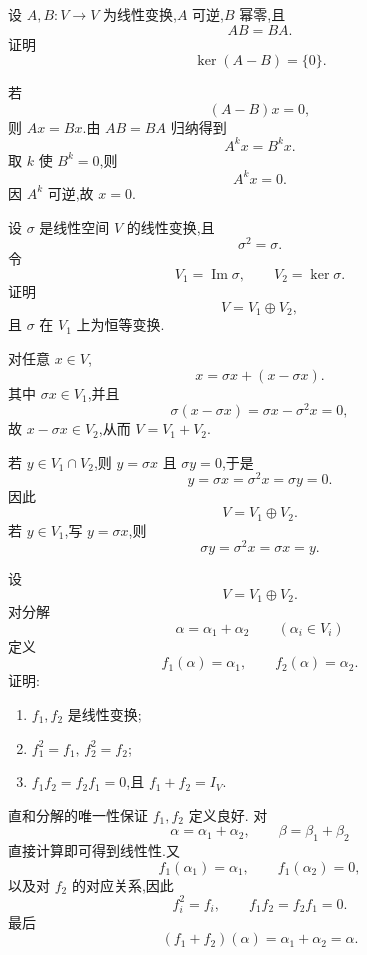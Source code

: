 \begin{example}
设 $A,B:V\to V$ 为线性变换,$A$ 可逆,$B$ 幂零,且
\[
AB=BA.
\]
证明
\[
\ker(A-B)=\{0\}.
\]
\end{example}
\exampleblank

\begin{solution}
若
\[
(A-B)x=0,
\]
则 $Ax=Bx$.由 $AB=BA$ 归纳得到
\[
A^k x=B^k x.
\]
取 $k$ 使 $B^k=0$,则
\[
A^k x=0.
\]
因 $A^k$ 可逆,故 $x=0$.
\end{solution}


\begin{example}[\markstar]
设 $\sigma$ 是线性空间 $V$ 的线性变换,且
\[
\sigma^2=\sigma.
\]
令
\[
V_1=\operatorname{Im}\sigma,
\qquad
V_2=\ker\sigma.
\]
证明
\[
V=V_1\oplus V_2,
\]
且 $\sigma$ 在 $V_1$ 上为恒等变换.
\end{example}
\exampleblank

\begin{solution}
对任意 $x\in V$,
\[
x=\sigma x+(x-\sigma x).
\]
其中 $\sigma x\in V_1$,并且
\[
\sigma(x-\sigma x)=\sigma x-\sigma^2x=0,
\]
故 $x-\sigma x\in V_2$,从而 $V=V_1+V_2$.

若 $y\in V_1\cap V_2$,则 $y=\sigma x$ 且 $\sigma y=0$,于是
\[
y=\sigma x=\sigma^2x=\sigma y=0.
\]
因此
\[
V=V_1\oplus V_2.
\]
若 $y\in V_1$,写 $y=\sigma x$,则
\[
\sigma y=\sigma^2x=\sigma x=y.
\]
\end{solution}


\begin{example}[\markstar]
设
\[
V=V_1\oplus V_2.
\]
对分解
\[
\alpha=\alpha_1+\alpha_2
\qquad
(\alpha_i\in V_i)
\]
定义
\[
f_1(\alpha)=\alpha_1,\qquad
f_2(\alpha)=\alpha_2.
\]
证明:
\begin{enumerate}
    \item $f_1,f_2$ 是线性变换;
    \item $f_1^2=f_1,\,f_2^2=f_2$;
    \item $f_1f_2=f_2f_1=0$,且 $f_1+f_2=I_V$.
\end{enumerate}
\end{example}
\exampleblank

\begin{solution}
直和分解的唯一性保证 $f_1,f_2$ 定义良好.
对
\[
\alpha=\alpha_1+\alpha_2,\qquad
\beta=\beta_1+\beta_2
\]
直接计算即可得到线性性.又
\[
f_1(\alpha_1)=\alpha_1,\qquad
f_1(\alpha_2)=0,
\]
以及对 $f_2$ 的对应关系,因此
\[
f_i^2=f_i,\qquad
f_1f_2=f_2f_1=0.
\]
最后
\[
(f_1+f_2)(\alpha)=\alpha_1+\alpha_2=\alpha.
\]
\end{solution}


